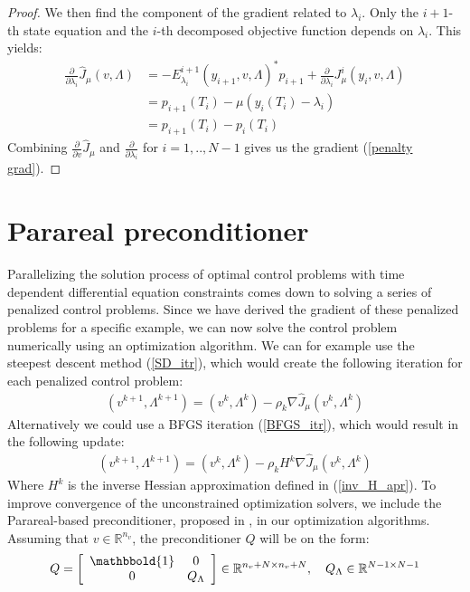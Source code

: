 \begin{proof}
We then find the component of the gradient related to $\lambda_i$. Only the $i+1$-th state equation and the $i$-th decomposed objective function depends on $\lambda_i$. This yields:
\begin{align*}
\frac{\partial}{\partial \lambda_i} \hat J_{\mu}(v,\Lambda) &= -E_{\lambda_i}^{i+1}(y_{i+1},v,\Lambda)^* p_{i+1} +  \frac{\partial}{\partial \lambda_i} J_{\mu}^i(y_i,v,\Lambda) \\
&= p_{i+1}(T_i)-\mu (y_{i}(T_i)-\lambda_i)\\
 &= p_{i+1}(T_i)-p_i(T_i)
\end{align*}
Combining $\frac{\partial}{\partial v} \hat J_{\mu}$ and $ \frac{\partial}{\partial \lambda_i}$ for $i=1,..,N-1$ gives us the gradient (\ref{penalty grad}).
\end{proof} 
\section{Parareal preconditioner} \label{pc sec}
Parallelizing the solution process of optimal control problems with time dependent differential equation constraints comes down to solving a series of penalized control problems. Since we have derived the gradient of these penalized problems for a specific example, we can now solve the control problem numerically using an optimization algorithm. We can for example use the steepest descent method (\ref{SD_itr}), which would create the following iteration for each penalized control problem:
\begin{align}
(v^{k+1},\Lambda^{k+1}) = (v^{k},\Lambda^{k}) -\rho_k\nabla\hat{J}_{\mu}(v^{k},\Lambda^{k}) \label{gradient_method}
\end{align}
Alternatively we could use a BFGS iteration (\ref{BFGS_itr}), which would result in the following update:
\begin{align}
(v^{k+1},\Lambda^{k+1}) = (v^{k},\Lambda^{k}) -\rho_kH^{k}\nabla\hat{J}_{\mu}(v^{k},\Lambda^{k}) \label{bfgs_method}
\end{align}
Where $H^k$ is the inverse Hessian approximation defined in (\ref{inv_H_apr}). To improve convergence of the unconstrained optimization solvers, we include the Parareal-based preconditioner, proposed in \cite{maday2002parareal}, in our optimization algorithms. Assuming that $v\in\mathbb{R}^{n_v}$, the preconditioner $Q$ will be on the form:
\begin{align}
Q = \left[ \begin{array}{cc}
	\mathbbold{1} & 0 \\
	0 & Q_{\Lambda} \\
	\end{array} \right]\in \mathbb{R}^{n_v+N\times n_v+N},\quad Q_{\Lambda}\in\mathbb{R}^{N-1\times N-1} \label{PC_form}
\end{align} 
